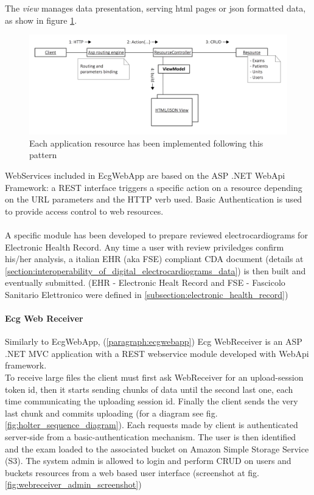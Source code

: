 The \textit{view} manages data presentation, serving html pages or json formatted data, as show in figure \ref{fig:app_resource_pattern}.\\
\begin{figure}[h]
    \includegraphics[width=\textwidth]{img/app_resource_pattern}
    \caption{Each application resource has been implemented following this pattern}
    \label{fig:app_resource_pattern}
\end{figure}
WebServices included in EcgWebApp are based on the ASP .NET WebApi Framework: a REST interface triggers a specific action on a resource depending on the URL parameters and the HTTP verb used. Basic Authentication is used to provide access control to web resources.\\ \\
A specific module has been developed to prepare reviewed electrocardiograms for Electronic Health Record. Any time a user with review priviledges confirm his/her analysis, a italian EHR (aka FSE) compliant CDA document (details at \ref{section:interoperability_of_digital_electrocardiograms_data}) is then built and eventually submitted. (EHR - Electronic Healt Record and FSE - Fascicolo Sanitario Elettronico were defined in \ref{subsection:electronic_health_record})
\paragraph{Ecg Web Receiver}
\label{paragraph:ecgwebreceiver}
Similarly to EcgWebApp, (\ref{paragraph:ecgwebapp}) Ecg WebReceiver is an ASP .NET MVC application with a REST webservice module developed with WebApi framework.\\
To receive large files the client must first ask WebReceiver for an upload-session token id, then it starts sending chunks of data until the second last one, each time communicating the uploading session id. Finally the client sends the very last chunk and commits uploading (for a diagram see fig.\ref{fig:holter_sequence_diagram}). Each requests made by client is authenticated server-side from a basic-authentication mechanism. The user is then identified and the exam loaded to the associated bucket on Amazon Simple Storage Service (S3).
The system admin is allowed to login and perform CRUD on users and buckets resources from a web based user interface (screenshot at fig. \ref{fig:webreceiver_admin_screenshot})

